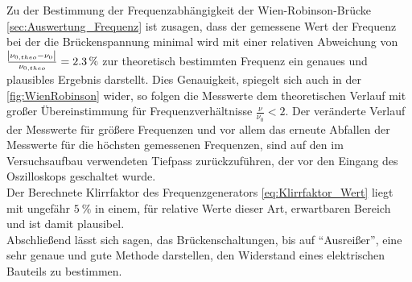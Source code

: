 Zu der Bestimmung der Frequenzabhängigkeit der Wien-Robinson-Brücke \cref{sec:Auswertung_Frequenz} ist zusagen, dass
der gemessene Wert der Frequenz bei der die Brückenspannung minimal wird mit einer relativen Abweichung 
von $\tfrac{\envert{\nu_{0,theo} - \nu_{0}}}{\nu_{0, theo}} = \SI{2.3}{\percent}$ zur theoretisch bestimmten 
Frequenz ein genaues und plausibles Ergebnis darstellt.
Dies Genauigkeit, spiegelt sich auch in der \cref{fig:WienRobinson} wider, so folgen die Messwerte dem 
theoretischen Verlauf mit großer Übereinstimmung für Frequenzverhältnisse $\frac{\nu}{\nu_{0}} < 2$. 
Der veränderte Verlauf der Messwerte für größere Frequenzen und vor allem das erneute Abfallen der Messwerte 
für die höchsten gemessenen Frequenzen, sind auf den im Versuchsaufbau verwendeten Tiefpass zurückzuführen,
der vor den Eingang des Oszilloskops geschaltet wurde.\\
Der Berechnete Klirrfaktor des Frequenzgenerators \cref{eq:Klirrfaktor_Wert} liegt mit 
ungefähr $\SI{5}{\percent}$ in einem, für 
relative Werte dieser Art, erwartbaren Bereich und ist damit plausibel. \\

Abschließend lässt sich sagen, das Brückenschaltungen, bis auf \enquote{Ausreißer}, eine sehr genaue und gute Methode
darstellen, den Widerstand eines elektrischen Bauteils zu bestimmen. 